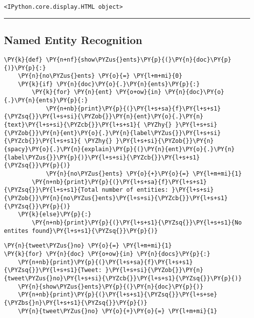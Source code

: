     
    
    \begin{Verbatim}[commandchars=\\\{\}]
<IPython.core.display.HTML object>
    \end{Verbatim}

    
    \begin{center}\rule{0.5\linewidth}{0.5pt}\end{center}

    \hypertarget{named-entity-recognition}{%
\subsection{Named Entity Recognition}\label{named-entity-recognition}}

    \begin{tcolorbox}[breakable, size=fbox, boxrule=1pt, pad at break*=1mm,colback=cellbackground, colframe=cellborder]
\begin{Verbatim}[commandchars=\\\{\}]
\PY{k}{def} \PY{n+nf}{show\PYZus{}ents}\PY{p}{(}\PY{n}{doc}\PY{p}{)}\PY{p}{:}
    \PY{n}{no\PYZus{}ents} \PY{o}{=} \PY{l+m+mi}{0}
    \PY{k}{if} \PY{n}{doc}\PY{o}{.}\PY{n}{ents}\PY{p}{:}
        \PY{k}{for} \PY{n}{ent} \PY{o+ow}{in} \PY{n}{doc}\PY{o}{.}\PY{n}{ents}\PY{p}{:}
            \PY{n+nb}{print}\PY{p}{(}\PY{l+s+sa}{f}\PY{l+s+s1}{\PYZsq{}}\PY{l+s+si}{\PYZob{}}\PY{n}{ent}\PY{o}{.}\PY{n}{text}\PY{l+s+si}{\PYZcb{}}\PY{l+s+s1}{ \PYZhy{} }\PY{l+s+si}{\PYZob{}}\PY{n}{ent}\PY{o}{.}\PY{n}{label\PYZus{}}\PY{l+s+si}{\PYZcb{}}\PY{l+s+s1}{ \PYZhy{} }\PY{l+s+si}{\PYZob{}}\PY{n}{spacy}\PY{o}{.}\PY{n}{explain}\PY{p}{(}\PY{n}{ent}\PY{o}{.}\PY{n}{label\PYZus{}}\PY{p}{)}\PY{l+s+si}{\PYZcb{}}\PY{l+s+s1}{\PYZsq{}}\PY{p}{)}
            \PY{n}{no\PYZus{}ents} \PY{o}{+}\PY{o}{=} \PY{l+m+mi}{1}
        \PY{n+nb}{print}\PY{p}{(}\PY{l+s+sa}{f}\PY{l+s+s1}{\PYZsq{}}\PY{l+s+s1}{Total number of entities: }\PY{l+s+si}{\PYZob{}}\PY{n}{no\PYZus{}ents}\PY{l+s+si}{\PYZcb{}}\PY{l+s+s1}{\PYZsq{}}\PY{p}{)}
    \PY{k}{else}\PY{p}{:}
        \PY{n+nb}{print}\PY{p}{(}\PY{l+s+s1}{\PYZsq{}}\PY{l+s+s1}{No entites found}\PY{l+s+s1}{\PYZsq{}}\PY{p}{)}
\end{Verbatim}
\end{tcolorbox}

    \begin{tcolorbox}[breakable, size=fbox, boxrule=1pt, pad at break*=1mm,colback=cellbackground, colframe=cellborder]
\begin{Verbatim}[commandchars=\\\{\}]
\PY{n}{tweet\PYZus{}no} \PY{o}{=} \PY{l+m+mi}{1}
\PY{k}{for} \PY{n}{doc} \PY{o+ow}{in} \PY{n}{docs}\PY{p}{:}
    \PY{n+nb}{print}\PY{p}{(}\PY{l+s+sa}{f}\PY{l+s+s1}{\PYZsq{}}\PY{l+s+s1}{Tweet: }\PY{l+s+si}{\PYZob{}}\PY{n}{tweet\PYZus{}no}\PY{l+s+si}{\PYZcb{}}\PY{l+s+s1}{\PYZsq{}}\PY{p}{)}
    \PY{n}{show\PYZus{}ents}\PY{p}{(}\PY{n}{doc}\PY{p}{)}
    \PY{n+nb}{print}\PY{p}{(}\PY{l+s+s1}{\PYZsq{}}\PY{l+s+se}{\PYZbs{}n}\PY{l+s+s1}{\PYZsq{}}\PY{p}{)}
    \PY{n}{tweet\PYZus{}no} \PY{o}{+}\PY{o}{=} \PY{l+m+mi}{1}
\end{Verbatim}
\end{tcolorbox}


